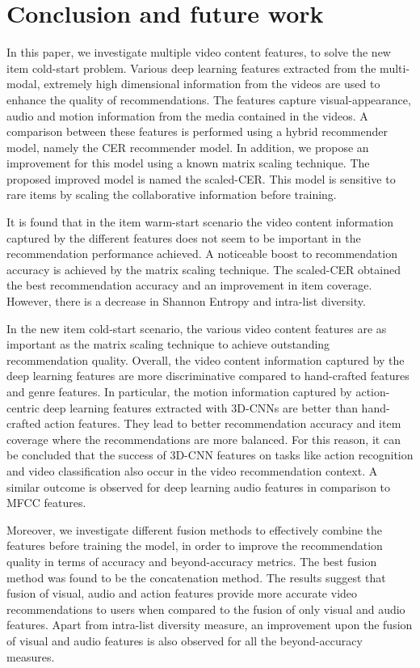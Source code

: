 \documentclass[review]{elsarticle}
\begin{document}
\section{Conclusion and future work}\label{sec:conclusion}

In this paper, we investigate multiple video content features, to solve the new item cold-start problem. Various deep learning features extracted from the multi-modal, extremely high dimensional information from the videos are used to enhance the quality of recommendations. The features capture visual-appearance, audio and motion information from the media contained in the videos. A comparison between these features is performed using a hybrid recommender model, namely the CER recommender model. In addition, we propose an improvement for this model using a known matrix scaling technique. The proposed improved model is named the scaled-CER. This model is sensitive to rare items by scaling the collaborative information before training.  

It is found that in the item warm-start scenario the video content information captured by the different features does not seem to be important in the recommendation performance achieved. A noticeable boost to recommendation accuracy is achieved by the matrix scaling technique. The scaled-CER obtained the best recommendation accuracy and an improvement in item coverage. However, there is a decrease in Shannon Entropy and intra-list diversity.

In the new item cold-start scenario, the various video content features are as important as the matrix scaling technique to achieve outstanding recommendation quality. Overall, the video content information captured by the deep learning features are more discriminative compared to hand-crafted features and genre features. In particular, the motion information captured by action-centric deep learning features extracted with 3D-CNNs are better than hand-crafted action features. They lead to better recommendation accuracy and item coverage where the recommendations are more balanced. For this reason, it can be concluded that the success of 3D-CNN features on tasks like action recognition and video classification also occur in the video recommendation context. A similar outcome is observed for deep learning audio features in comparison to MFCC features.

Moreover, we investigate different fusion methods to effectively combine the features before training the model, in order to improve the recommendation quality in terms of accuracy and beyond-accuracy metrics. The best fusion method was found to be the concatenation method. The results suggest that fusion of visual, audio and action features provide more accurate video recommendations to users when compared to the fusion of only visual and audio features. Apart from intra-list diversity measure, an improvement upon the fusion of visual and audio features is also observed for all the beyond-accuracy measures. 
\end{document}
